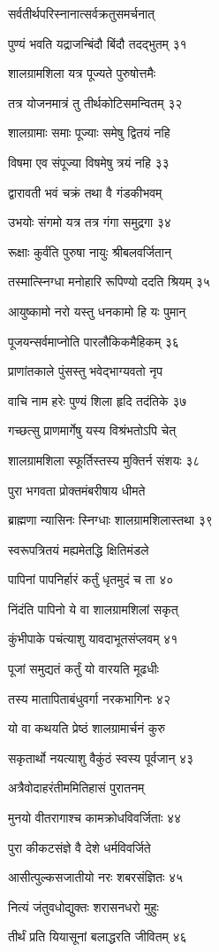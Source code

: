 सर्वतीर्थपरिस्नानात्सर्वक्रतुसमर्चनात्

पुण्यं भवति यद्राजन्बिंदौ बिंदौ तदद्भुतम् ३१

शालग्रामशिला यत्र पूज्यते पुरुषोत्तमैः

तत्र योजनमात्रं तु तीर्थकोटिसमन्वितम् ३२

शालग्रामाः समाः पूज्याः समेषु द्वितयं नहि

विषमा एव संपूज्या विषमेषु त्रयं नहि ३३

द्वारावती भवं चक्रं तथा वै गंडकीभवम्

उभयोः संगमो यत्र तत्र गंगा समुद्रगा ३४

रूक्षाः कुर्वंति पुरुषा नायुः श्रीबलवर्जितान्

तस्मात्स्निग्धा मनोहारि रूपिण्यो ददति श्रियम् ३५

आयुष्कामो नरो यस्तु धनकामो हि यः पुमान्

पूजयन्सर्वमाप्नोति पारलौकिकमैहिकम् ३६

प्राणांतकाले पुंसस्तु भवेद्भाग्यवतो नृप

वाचि नाम हरेः पुण्यं शिला हृदि तदंतिके ३७

गच्छत्सु प्राणमार्गेषु यस्य विश्रंभतोऽपि चेत्

शालग्रामशिला स्फूर्तिस्तस्य मुक्तिर्न संशयः ३८

पुरा भगवता प्रोक्तमंबरीषाय धीमते

ब्राह्मणा न्यासिनः स्निग्धाः शालग्रामशिलास्तथा ३९

स्वरूपत्रितयं मह्यमेतद्धि क्षितिमंडले

पापिनां पापनिर्हारं कर्तुं धृतमुदं च ता ४०

निंदंति पापिनो ये वा शालग्रामशिलां सकृत्

कुंभीपाके पचंत्याशु यावदाभूतसंप्लवम् ४१

पूजां समुद्यतं कर्तुं यो वारयति मूढधीः

तस्य मातापिताबंधुवर्गा नरकभागिनः ४२

यो वा कथयति प्रेष्ठं शालग्रामार्चनं कुरु

सकृतार्थो नयत्याशु वैकुंठं स्वस्य पूर्वजान् ४३

अत्रैवोदाहरंतीममितिहासं पुरातनम्

मुनयो वीतरागाश्च कामक्रोधविवर्जिताः ४४

पुरा कीकटसंज्ञे वै देशे धर्मविवर्जिते

आसीत्पुल्कसजातीयो नरः शबरसंज्ञितः ४५

नित्यं जंतुवधोद्युक्तः शरासनधरो मुहुः

तीर्थं प्रति यियासूनां बलाद्धरति जीवितम् ४६

